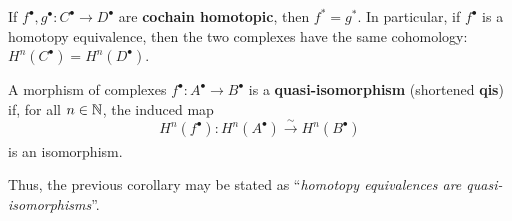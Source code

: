 \begin{cor}
    If $f^{\bullet}, g^{\bullet}: C^{\bullet} \to D^{\bullet}$
    are \textbf{cochain homotopic}, then $f^* = g^*$.
    In particular, if $f^{\bullet}$ is a homotopy equivalence,
    then the two complexes have the same cohomology: 
    $H^{n}(C^{\bullet}) = H^{n}(D^{\bullet})$.
\end{cor}

\begin{df}
    A morphism of complexes
    $f^{\bullet} : A^{\bullet} \to B^{\bullet}$
    is a \textbf{quasi-isomorphism} (shortened \textbf{qis})
    if, for all $n \in \mathbb{N}$, the induced map
    \begin{equation*}
        H^{n}(f^{\bullet}) : H^{n}(A^{\bullet}) \xrightarrow[]{\sim} H^{n}(B^{\bullet})
    \end{equation*}
    is an isomorphism.
\end{df}

Thus, the previous corollary may be stated as 
``\emph{homotopy equivalences are quasi-isomorphisms}''.
